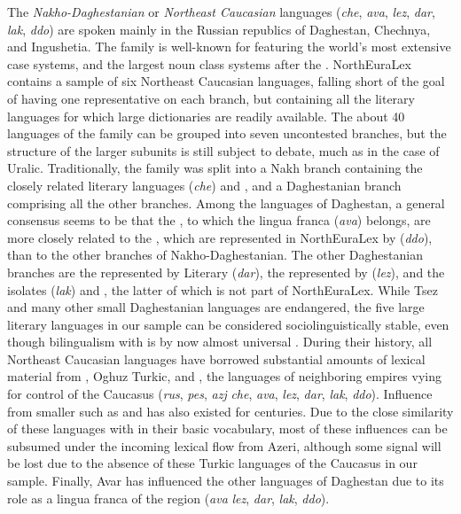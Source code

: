 The \textit{Nakho-Daghestanian} or \textit{Northeast Caucasian} languages (\textit{che}, \textit{ava}, \textit{lez}, \textit{dar}, \textit{lak}, \textit{ddo}) are spoken mainly in the Russian republics of Daghestan, Chechnya, and Ingushetia. The family is well-known for featuring the world's most extensive case systems, and the largest noun class systems after the . NorthEuraLex contains a sample of six Northeast Caucasian languages, falling short of the goal of having one representative on each branch, but containing all the literary languages for which large dictionaries are readily available. The about 40 languages of the family can be grouped into seven uncontested branches, but the structure of the larger subunits is still subject to debate, much as in the case of Uralic. Traditionally, the family was split into a Nakh branch containing the closely related literary languages  (\textit{che}) 
and , and a Daghestanian branch comprising all the other branches. Among the languages of Daghestan, a general consensus seems to be that the , to which the lingua franca  (\textit{ava}) belongs, are more closely related to the , which are represented in NorthEuraLex by  (\textit{ddo}), than to the other branches of Nakho-Daghestanian. The other Daghestanian branches are the  represented by Literary  (\textit{dar}), the  represented by  (\textit{lez}), and the isolates  (\textit{lak}) and , the latter of which is not part of NorthEuraLex. While Tsez and many other small Daghestanian languages are endangered, the five large literary languages in our sample can be considered sociolinguistically stable, even though bilingualism with  is by now almost universal \citep{hewitt2004}. During their history, 
all Northeast Caucasian languages have borrowed substantial amounts of lexical material from , Oghuz Turkic, and , the languages of neighboring empires vying for control of the Caucasus (\textit{rus}, \textit{pes}, \textit{azj} \arrowLA \textit{che}, \textit{ava}, \textit{lez}, \textit{dar}, \textit{lak}, \textit{ddo}). Influence from smaller  such as  and  has also existed for centuries. Due to the close similarity of these languages with  in their basic vocabulary, most of these influences can be subsumed under the incoming lexical flow from Azeri, although some signal will be lost due to the absence of these Turkic languages of the Caucasus in our sample. Finally, Avar has influenced the other languages of Daghestan due to its role as a lingua franca of the region (\textit{ava} \arrowOA \textit{lez}, \textit{dar}, \textit{lak}, \textit{ddo}).

